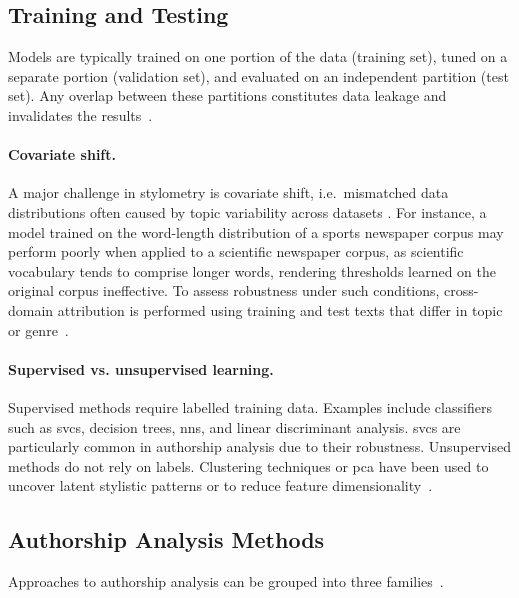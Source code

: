 \subsection{Training and Testing}

Models are typically trained on one portion of the data (training set), tuned on a separate portion (validation set), and evaluated on an independent partition (test set). 
Any overlap between these partitions constitutes data leakage and invalidates the results~\citep{bischoff_importance_2020,altakrori_topic_2021,boenninghoff_o2d2_2021}. 

\paragraph{Covariate shift.} %
A major challenge in stylometry is covariate shift, i.e.\ mismatched data distributions often caused by topic variability across datasets \citep{boenninghoff_o2d2_2021}. 
For instance, a model trained on the word-length distribution of a sports newspaper corpus may perform poorly when applied to a scientific newspaper corpus, as scientific vocabulary tends to comprise longer words, rendering thresholds learned on the original corpus ineffective. 
To assess robustness under such conditions, cross-domain attribution is performed using training and test texts that differ in topic or genre~\citep{barlas_cross_domain_2020}.

\paragraph{Supervised vs. unsupervised learning.}  
Supervised methods require labelled training data. 
Examples include classifiers such as \acp{svc}, decision trees, \acp{nn}, and linear discriminant analysis. 
\acp{svc} are particularly common in authorship analysis due to their robustness. 
Unsupervised methods do not rely on labels.
Clustering techniques or \acl{pca} have been used to uncover latent stylistic patterns or to reduce feature dimensionality~\citep{abbasi_writeprints_2008}.


\subsection{Authorship Analysis Methods}
\label{subsec:attribution_methods}

Approaches to authorship analysis can be grouped into three families~\citep{stamatatos_survey_2009}.

